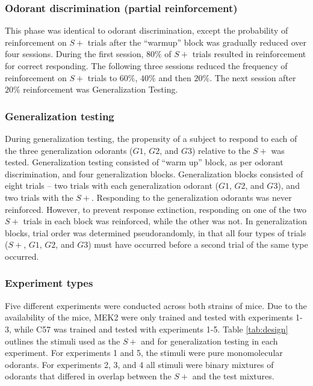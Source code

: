 \subsubsection*{Odorant discrimination (partial reinforcement)}
\label{sec:methods_discrimination}
This phase was identical to odorant discrimination, except the probability of reinforcement on $S+$ trials after the ``warmup'' block was gradually reduced over four sessions. During the first session, $80\%$ of $S+$ trials resulted in reinforcement for correct responding. The following three sessions reduced the frequency of reinforcement on $S+$ trials to $60\%$, $40\%$ and then $20\%$. The next session after $20\%$ reinforcement was Generalization Testing.

\subsubsection*{Generalization testing}
\label{sec:methods_training}
During generalization testing, the propensity of a subject to respond to each of the three generalization odorants ($G1$, $G2$, and $G3$) relative to the $S+$ was tested. Generalization testing consisted of ``warm up'' block, as per odorant discrimination, and four generalization blocks. Generalization blocks consisted of eight trials – two trials with each generalization odorant ($G1$, $G2$, and $G3$), and two trials with the $S+$. Responding to the generalization odorants was never reinforced. However, to prevent response extinction, responding on one of the two $S+$ trials in each block was reinforced, while the other was not. In generalization blocks, trial order was determined pseudorandomly, in that all four types of trials ($S+$, $G1$, $G2$, and $G3$) must have occurred before a second trial of the same type occurred.

\subsubsection*{Experiment types}
\label{sec:methods_experiment_types}
Five different experiments were conducted across both strains of mice. Due to the availability of the mice, MEK2 were only trained and tested with experiments 1-3, while C57 was trained and tested with experiments 1-5.  Table \ref{tab:design} outlines the stimuli used as the $S+$ and for generalization testing in each experiment. For experiments 1 and 5, the stimuli were pure monomolecular odorants. For experiments 2, 3, and 4 all stimuli were binary mixtures of odorants that differed in overlap between the $S+$ and the test mixtures. 

